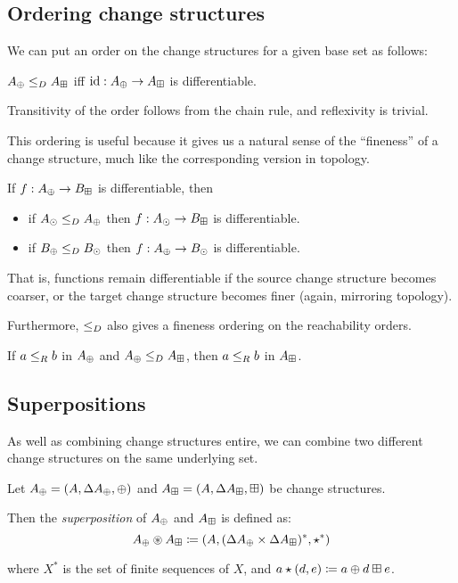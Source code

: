 \subsection{Ordering change structures}

We can put an order on the change structures for a given base set as follows:

\begin{defn}
  $A_\oplus \leq_D A_\boxplus$ iff $\textrm{id}: A_\oplus \rightarrow A_\boxplus$ is differentiable.
\end{defn}

Transitivity of the order follows from the chain rule, and reflexivity is trivial.

This ordering is useful because it gives us a natural sense of the ``fineness''
of a change structure, much like the corresponding version in topology.

\begin{prop}
  If $f: A_\oplus \rightarrow B_\boxplus$ is differentiable, then
  \begin{itemize}
    \item if $A_\odot \leq_D A_\oplus$ then $f: A_\odot \rightarrow
      B_\boxplus$ is differentiable.
    \item if $B_\oplus \leq_D B_\odot$ then $f: A_\oplus \rightarrow
      B_\odot$ is differentiable.
  \end{itemize}
\end{prop}

That is, functions remain differentiable if the source change structure becomes
coarser, or the target change structure becomes finer (again, mirroring topology).

Furthermore, $\leq_D$ also gives a fineness ordering on the reachability orders.

\begin{prop}
  If $a \leq_R b$ in $A_\oplus$ and $A_\oplus \leq_D A_\boxplus$, then $a \leq_R b$ in $A_\boxplus$.
\end{prop}

\subsection{Superpositions}

As well as combining change structures entire, we can combine two different
change structures on the same underlying set.

\begin{defn}[Superposition]
  Let $A_\oplus = (A,\Delta A_\oplus,\oplus)$ and $A_\boxplus =
  (A,\Delta A_\boxplus,\boxplus)$ be change structures.

  Then the \textit{superposition} of $A_\oplus$ and $A_\boxplus$ is defined as:
  $$A_\oplus \circledast A_\boxplus \coloneqq (A,
    (\Delta A_\oplus \times \Delta A_\boxplus)^\ast,\star^\ast)$$

  where $X^\ast$ is the set of finite sequences of $X$, and $a \star (d, e)
  \coloneqq a \oplus d \boxplus e$.
\end{defn}

